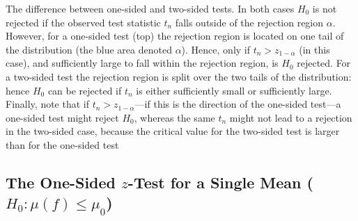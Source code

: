 The difference between one-sided and two-sided tests.
In both cases $H_0$ is not rejected if the observed test statistic $t_n$ falls outside of the rejection region $\alpha$.
However, for a one-sided test (top) the rejection region is located on one tail of the distribution (the blue area denoted $\alpha$).
Hence, only if $t_n > z_{1-\alpha}$ (in this case), and sufficiently large to fall within the rejection region, is $H_0$ rejected.
For a two-sided test the rejection region is split over the two tails of the distribution: hence $H_0$ can be rejected if $t_n$ is either sufficiently small or sufficiently large.
Finally, note that if $t_n > z_{1-\alpha}$—if this is the direction of the one-sided test—a one-sided test might reject $H_0 $, whereas the same $t_n$ might not lead to a rejection in the two-sided case, because the critical value for the two-sided test is larger than for the one-sided test
\hfill \cite{statistics/book/Statistics-for-Data-Scientists/Maurits-Kaptein}

















\subsection{The One-Sided $z$-Test for a Single Mean ($H_0:\mu(f) \leq \mu_0$)}

